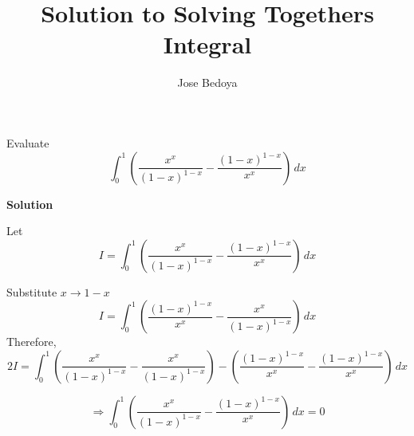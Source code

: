 \documentclass{article}
\begin{document}
\title{Solution to Solving Together\textsc{}s Integral}
\author{Jose Bedoya}
\maketitle
{\normalsize
\vspace{5mm}

Evaluate
$$\int_{0}^{1} \left(\frac{x^x}{(1-x)^{1-x}}-\frac{(1-x)^{1-x}}{x^x}\right)\,dx $$

\vspace{5mm}
\textbf{Solution}

\vspace{4mm}
Let
$$I = \int_{0}^{1} \left(\frac{x^x}{(1-x)^{1-x}}-\frac{(1-x)^{1-x}}{x^x}\right)\,dx $$

Substitute $x \rightarrow 1-x$
$$I = \int_{0}^{1} \left(\frac{(1-x)^{1-x}}{x^x}-\frac{x^x}{(1-x)^{1-x}}\right)\,dx $$
Therefore,
$$ 2I = \int_{0}^{1} \left(\frac{x^x}{(1-x)^{1-x}}-\frac{x^x}{(1-x)^{1-x}}\right) - \left(\frac{(1-x)^{1-x}}{x^x}-\frac{(1-x)^{1-x}}{x^x}\right)\,dx $$
}
$$\Rightarrow \int_{0}^{1} \left(\frac{x^x}{(1-x)^{1-x}}-\frac{(1-x)^{1-x}}{x^x}\right)\,dx = 0$$
\end{document}
